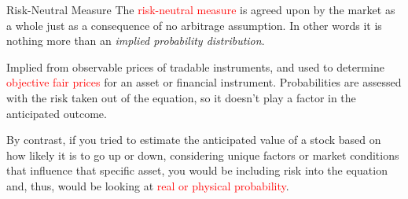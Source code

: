 \documentclass{beamer}
\begin{document}
\begin{frame}{Risk-Neutral Measure}
	The \textcolor{red}{risk-neutral measure} is agreed upon by the market as a whole just as a consequence of no arbitrage assumption.
	In other words it is nothing more than an \emph{implied probability distribution}.
	\pause
	
	Implied from observable prices of tradable instruments, and used to determine \textcolor{red}{objective fair prices} for an asset or financial instrument. Probabilities are assessed with the risk taken out of the equation, so it doesn’t play a factor in the anticipated outcome.
	\pause
	
	By contrast, if you tried to estimate the anticipated value of a stock based on how likely it is to go up or down, considering unique factors or market conditions that influence that specific asset, you would be including risk into the equation and, thus, would be looking at \textcolor{red}{real or physical probability}.
\end{frame}
\end{document}
